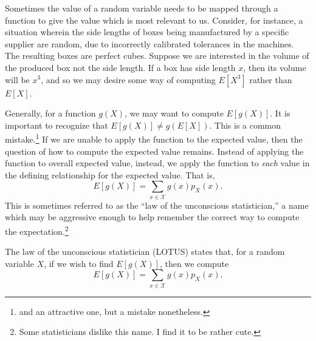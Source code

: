 \documentclass[
  letterpaper,
  DIV=11,
  numbers=noendperiod]{scrreprt}
\theoremstyle{definition}
\theoremstyle{definition}
\theoremstyle{definition}
\theoremstyle{remark}
\begin{document}
Sometimes the value of a random variable needs to be mapped through a
function to give the value which is most relevant to us. Consider, for
instance, a situation wherein the side lengths of boxes being
manufactured by a specific supplier are random, due to incorrectly
calibrated tolerances in the machines. The resulting boxes are perfect
cubes. Suppose we are interested in the volume of the produced box not
the side length. If a box has side length \(x\), then its volume will be
\(x^3\), and so we may desire some way of computing \(E[X^3]\) rather
than \(E[X]\).

Generally, for a function \(g(X)\), we may want to compute \(E[g(X)]\).
It is important to recognize that \(E[g(X)] \neq g(E[X])\). This is a
common mistake.\footnote{and an attractive one, but a mistake
  nonetheless.} If we are unable to apply the function to the expected
value, then the question of how to compute the expected value remains.
Instead of applying the function to overall expected value, instead, we
apply the function to \emph{each} value in the defining relationship for
the expected value. That is,
\[E[g(X)] = \sum_{x\in\mathcal{X}} g(x)p_X(x).\] This is sometimes
referred to as the ``law of the unconscious statistician,'' a name which
may be aggressive enough to help remember the correct way to compute the
expectation.\footnote{Some statisticians dislike this name. I find it to
  be rather cute.}

\begin{tcolorbox}[enhanced jigsaw, rightrule=.15mm, leftrule=.75mm, opacitybacktitle=0.6, title={The Law of the Unconscious Statistician}, colframe=quarto-callout-note-color-frame, opacityback=0, coltitle=black, breakable, toptitle=1mm, colbacktitle=quarto-callout-note-color!10!white, bottomtitle=1mm, titlerule=0mm, arc=.35mm, colback=white, toprule=.15mm, left=2mm, bottomrule=.15mm]

The law of the unconscious statistician (LOTUS) states that, for a
random variable \(X\), if we wish to find \(E[g(X)]\), then we compute
\[E[g(X)] = \sum_{x\in\mathcal{X}} g(x)p_X(x).\]

\end{tcolorbox}
\end{document}
